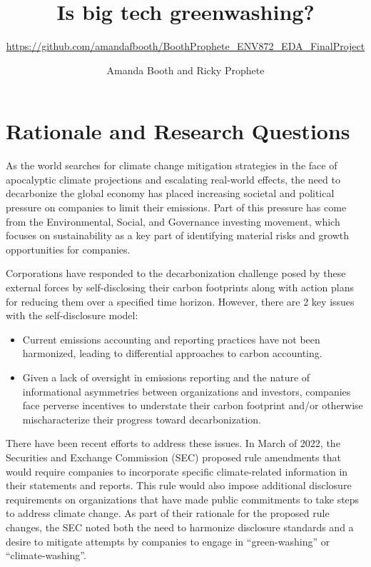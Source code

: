 \documentclass[
  12pt,
]{article}
\title{Is big tech greenwashing?}
\subtitle{\url{https://github.com/amandafbooth/BoothProphete_ENV872_EDA_FinalProject}}
\author{Amanda Booth and Ricky Prophete}
\date{}
\begin{document}
\maketitle

\newpage
\tableofcontents 
\newpage
\listoftables 
\newpage
\listoffigures 
\newpage

\hypertarget{rationale-and-research-questions}{%
\section{Rationale and Research
Questions}\label{rationale-and-research-questions}}

As the world searches for climate change mitigation strategies in the
face of apocalyptic climate projections and escalating real-world
effects, the need to decarbonize the global economy has placed
increasing societal and political pressure on companies to limit their
emissions. Part of this pressure has come from the Environmental,
Social, and Governance investing movement, which focuses on
sustainability as a key part of identifying material risks and growth
opportunities for companies.

Corporations have responded to the decarbonization challenge posed by
these external forces by self-disclosing their carbon footprints along
with action plans for reducing them over a specified time horizon.
However, there are 2 key issues with the self-disclosure model:

\begin{itemize}
\item
  Current emissions accounting and reporting practices have not been
  harmonized, leading to differential approaches to carbon accounting.
\item
  Given a lack of oversight in emissions reporting and the nature of
  informational asymmetries between organizations and investors,
  companies face perverse incentives to understate their carbon
  footprint and/or otherwise mischaracterize their progress toward
  decarbonization.
\end{itemize}

There have been recent efforts to address these issues. In March of
2022, the Securities and Exchange Commission (SEC) proposed rule
amendments that would require companies to incorporate specific
climate-related information in their statements and reports. This rule
would also impose additional disclosure requirements on organizations
that have made public commitments to take steps to address climate
change. As part of their rationale for the proposed rule changes, the
SEC noted both the need to harmonize disclosure standards and a desire
to mitigate attempts by companies to engage in ``green-washing'' or
``climate-washing''.
\end{document}
